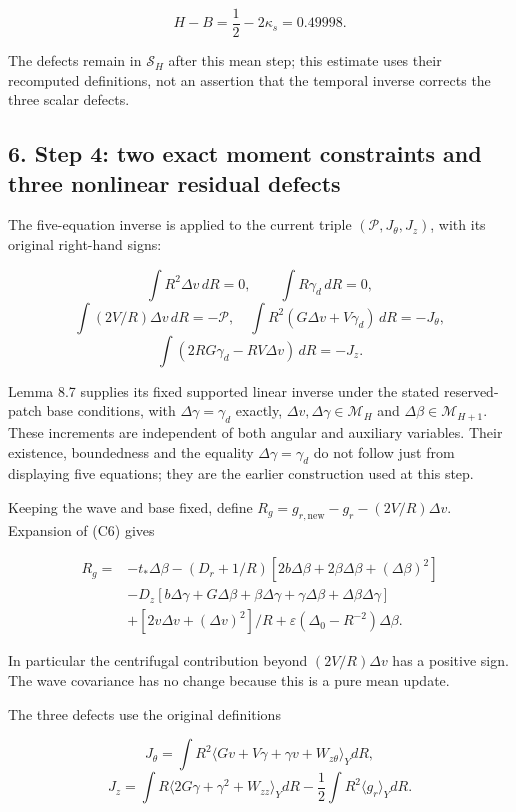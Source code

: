 \documentclass[10pt,a4paper]{article}
\begin{document}
\[
H-B=\frac12-2\kappa_s=0.49998.
\tag{C20}
\]

The defects remain in \(\mathcal S_H\) after this mean step; this estimate uses their recomputed definitions, not an assertion that the temporal inverse corrects the three scalar defects.

\subsection{6. Step 4: two exact moment constraints and three nonlinear residual defects}\label{nsupstream:stage_cycle_gain_audit:step-4-two-exact-moment-constraints-and-three-nonlinear-residual-defects}

The five-equation inverse is applied to the current triple \((\mathcal P,J_\theta,J_z)\), with its original right-hand signs:

\[
\int R^2\Delta v\,dR=0,\qquad\int R\gamma_d\,dR=0,
\] \[
\int(2V/R)\Delta v\,dR=-\mathcal P,
\quad\int R^2(G\Delta v+V\gamma_d)\,dR=-J_\theta,
\] \[
\int(2RG\gamma_d-RV\Delta v)\,dR=-J_z.
\tag{C21}
\]

Lemma 8.7 supplies its fixed supported linear inverse under the stated reserved-patch base conditions, with \(\Delta\gamma=\gamma_d\) exactly, \(\Delta v,\Delta\gamma\in\mathcal M_H\) and \(\Delta\beta\in\mathcal M_{H+1}\). These increments are independent of both angular and auxiliary variables. Their existence, boundedness and the equality \(\Delta\gamma=\gamma_d\) do not follow just from displaying five equations; they are the earlier construction used at this step.

Keeping the wave and base fixed, define \(R_g=g_{r,\mathrm{new}}-g_r-(2V/R)\Delta v\). Expansion of (C6) gives

\[
\begin{aligned}
R_g={}&-t_*\Delta\beta
-(D_r+1/R)[2b\Delta\beta+2\beta\Delta\beta+(\Delta\beta)^2]\\
&-D_z[b\Delta\gamma+G\Delta\beta+\beta\Delta\gamma
+\gamma\Delta\beta+\Delta\beta\Delta\gamma]\\
&+[2v\Delta v+(\Delta v)^2]/R
+\varepsilon(\Delta_0-R^{-2})\Delta\beta.
\end{aligned}
\tag{C22}
\]

In particular the centrifugal contribution beyond \((2V/R)\Delta v\) has a positive sign. The wave covariance has no change because this is a pure mean update.

The three defects use the original definitions

\[
J_\theta=\int R^2\langle Gv+V\gamma+\gamma v+W_{z\theta}\rangle_YdR,
\] \[
J_z=\int R\langle2G\gamma+\gamma^2+W_{zz}\rangle_YdR
-\frac12\int R^2\langle g_r\rangle_YdR.
\tag{C23}
\]
\end{document}
